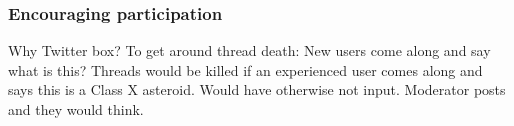 \documentclass{sigchi}
\begin{document}
\subsubsection{Encouraging participation}



Why Twitter box?  To get around thread death: New users come along and say what is this? Threads would be killed if an experienced user comes along and says this is a Class X asteroid. Would have otherwise not input. Moderator posts and they would think. %






\end{document}
